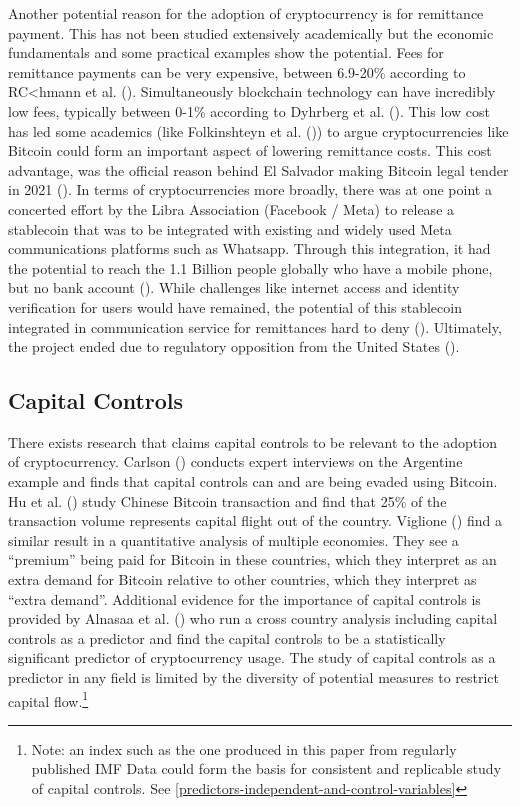 \documentclass[
]{article}
\begin{document}
Another potential reason for the adoption of cryptocurrency is for remittance payment. This has not been studied extensively academically but the economic fundamentals and some practical examples show the potential. Fees for remittance payments can be very expensive, between 6.9-20\% according to RC\textless hmann et al. (). Simultaneously blockchain technology can have incredibly low fees, typically between 0-1\% according to Dyhrberg et al. (). This low cost has led some academics (like Folkinshteyn et al. ()) to argue cryptocurrencies like Bitcoin could form an important aspect of lowering remittance costs. This cost advantage, was the official reason behind El Salvador making Bitcoin legal tender in 2021 (). In terms of cryptocurrencies more broadly, there was at one point a concerted effort by the Libra Association (Facebook / Meta) to release a stablecoin that was to be integrated with existing and widely used Meta communications platforms such as Whatsapp. Through this integration, it had the potential to reach the 1.1 Billion people globally who have a mobile phone, but no bank account (). While challenges like internet access and identity verification for users would have remained, the potential of this stablecoin integrated in communication service for remittances hard to deny (). Ultimately, the project ended due to regulatory opposition from the United States ().

\subsection{Capital Controls}\label{capital-controls}

There exists research that claims capital controls to be relevant to the adoption of cryptocurrency. Carlson () conducts expert interviews on the Argentine example and finds that capital controls can and are being evaded using Bitcoin. Hu et al. () study Chinese Bitcoin transaction and find that 25\% of the transaction volume represents capital flight out of the country. Viglione () find a similar result in a quantitative analysis of multiple economies. They see a ``premium'' being paid for Bitcoin in these countries, which they interpret as an extra demand for Bitcoin relative to other countries, which they interpret as ``extra demand''. Additional evidence for the importance of capital controls is provided by Alnasaa et al. () who run a cross country analysis including capital controls as a predictor and find the capital controls to be a statistically significant predictor of cryptocurrency usage. The study of capital controls as a predictor in any field is limited by the diversity of potential measures to restrict capital flow.\footnote{Note: an index such as the one produced in this paper from regularly published IMF Data could form the basis for consistent and replicable study of capital controls. See \ref{predictors-independent-and-control-variables}}
\end{document}
